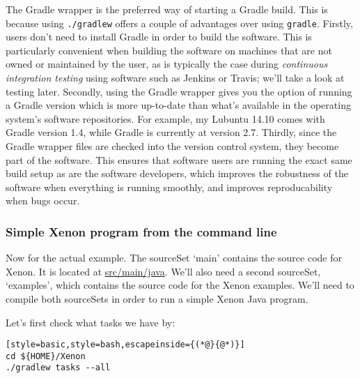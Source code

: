 The Gradle wrapper is the preferred way of starting a Gradle build. This is because using \texttt{./gradlew} offers a couple of advantages over using \texttt{gradle}.
%
Firstly, users don't need to install Gradle in order to build the software. This is particularly convenient when  building the software on machines that are not owned or maintained by the user, as is typically the case during \textit{continuous integration testing} using software such as Jenkins or Travis; we'll take a look at testing later.
%
Secondly, using the Gradle wrapper gives you the option of running a Gradle version which is more up-to-date than what's available in the operating system's software repositories. For example, my Lubuntu 14.10 comes with Gradle version 1.4, while Gradle is currently at version 2.7.
%
Thirdly, since the Gradle wrapper files are checked into the version control system, they become part of the software. This ensures that software users are running the exact same build setup as are the software developers, which improves the robustness of the software when everything is running smoothly, and improves reproducability when bugs occur.










\subsubsection{Simple Xenon program from the command line}

Now for the actual example. The sourceSet `main' contains the source code for Xenon. It is located at \url{src/main/java}. We'll also need a second sourceSet, `examples', which contains the source code for the Xenon examples. We'll need to compile both sourceSets in order to run a simple Xenon Java program.

Let's first check what tasks we have by:
\begin{lstlisting}[style=basic,style=bash,escapeinside={(*@}{@*)}]
cd ${HOME}/Xenon
./gradlew tasks --all
\end{lstlisting} %

